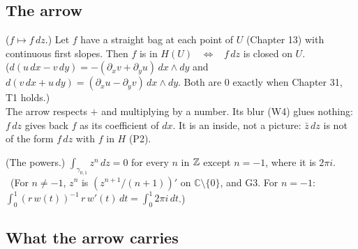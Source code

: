 \subsection*{The arrow}

\begin{lines}
\item[\lab{T1}] ($f \mapsto f\,dz$.) Let $f$ have a straight bag at each point of $U$ (Chapter 13) with continuous first slopes. Then $f$ is in $H(U)$ \ $\iff$ \ $f\,dz$ is closed on $U$. \\
($d(u\,dx - v\,dy) = -(\partial_x v + \partial_y u)\,dx \wedge dy$ and $d(v\,dx + u\,dy) = (\partial_x u - \partial_y v)\,dx \wedge dy$. Both are $0$ exactly when Chapter 31, T1 holds.) \\
The arrow respects $+$ and multiplying by a number. Its blur (W4) glues nothing: $f\,dz$ gives back $f$ as its coefficient of $dx$. It is an inside, not a picture: $\bar z\,dz$ is not of the form $f\,dz$ with $f$ in $H$ (P2).
\item[\lab{P1}] (The powers.) $\int_{\gamma_{0,1}} z^n\,dz = 0$ for every $n$ in $\mathbb{Z}$ except $n = -1$, where it is $2\pi i$. \ (For $n \ne -1$, $z^n$ is $(z^{n+1}/(n+1))'$ on $\mathbb{C} \setminus \{0\}$, and G3. For $n = -1$: $\int_0^1 (r\,w(t))^{-1}\, r\,w'(t)\, dt = \int_0^1 2\pi i \, dt$.)
\end{lines}

\subsection*{What the arrow carries}

